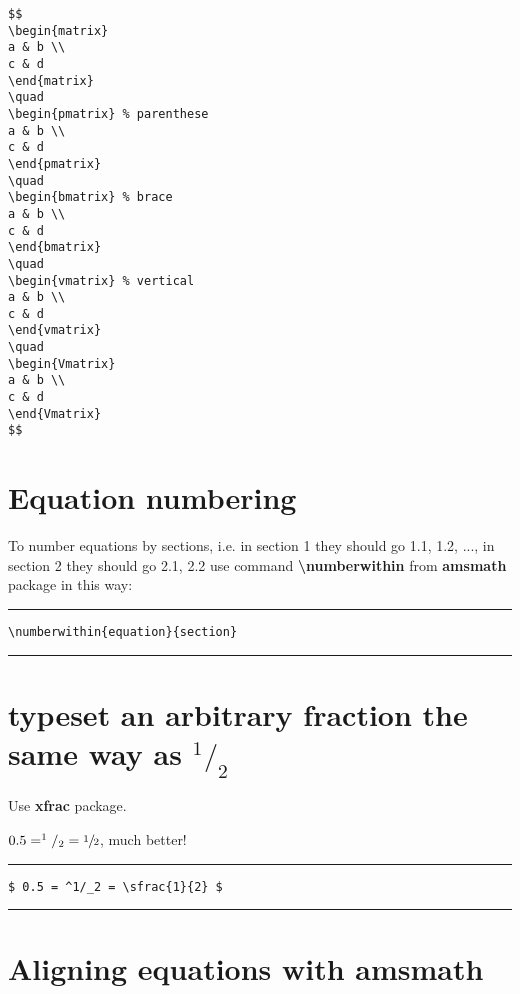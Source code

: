 \begin{lstlisting}[language={[LaTeX]TeX}]
$$
\begin{matrix} 
a & b \\
c & d 
\end{matrix}
\quad
\begin{pmatrix} % parenthese
a & b \\
c & d 
\end{pmatrix}
\quad
\begin{bmatrix} % brace
a & b \\
c & d 
\end{bmatrix}
\quad
\begin{vmatrix} % vertical
a & b \\
c & d 
\end{vmatrix}
\quad
\begin{Vmatrix} 
a & b \\
c & d 
\end{Vmatrix}
$$
\end{lstlisting}

\section{Equation numbering}
To number equations by sections, i.e. in section 1 they should go 1.1, 1.2, ..., in section 2 they should go 2.1, 2.2 use command \textbf{\textbackslash numberwithin} from \textbf{amsmath} package in this way:

\noindent\vspace{1em}\hrule
\verb|\numberwithin{equation}{section}|
\noindent\hrule\vspace{1em}

\section{typeset an arbitrary fraction the same way as $ ^1/_2 $}
Use \textbf{xfrac} package.

$ 0.5 = ^1/_2 = \sfrac{1}{2} $, much better!

\noindent\vspace{1em}\hrule
\begin{verbatim}
$ 0.5 = ^1/_2 = \sfrac{1}{2} $
\end{verbatim}
\noindent\hrule\vspace{1em}

\section{Aligning equations with amsmath}

